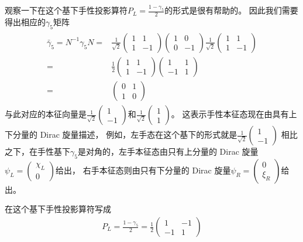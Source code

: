 观察一下在这个基下手性投影算符$P_L=\frac{1-\gamma_5}{2}$的形式是很有帮助的。
因此我们需要得出相应的$\gamma_5$矩阵
\begin{align}
\begin{split}
  \bar{\gamma}_5=N^{-1}\gamma_5N=&\frac{1}{\sqrt{2}}\begin{pmatrix}1&1\\1&-1\end{pmatrix}\begin{pmatrix}1&0\\0&-1\end{pmatrix}
  \frac{1}{\sqrt{2}}\begin{pmatrix}1&1\\1&-1\end{pmatrix}\\
  =&\frac{1}{2}\begin{pmatrix}1&1\\1&-1\end{pmatrix}\begin{pmatrix}1&1\\-1&1\end{pmatrix}\\
  =&\begin{pmatrix}0&1\\1&0\end{pmatrix}
\end{split}
\end{align}
与此对应的本征向量是$\frac{1}{\sqrt{2}}\begin{pmatrix}1\\-1\end{pmatrix}$和$\frac{1}{\sqrt{2}}\begin{pmatrix}1\\1\end{pmatrix}$。
这表示手性本征态现在由具有上下分量的 Dirac 旋量描述，
例如，左手态在这个基下的形式就是$\frac{1}{\sqrt{2}}\begin{pmatrix}1\\-1\end{pmatrix}$
相比之下，在手性基下$\gamma_5$是对角的，左手本征态由只有上分量的 Dirac 旋量$\psi_L=\begin{pmatrix}\chi_L\\0\end{pmatrix}$给出，
右手本征态则由只有下分量的 Dirac 旋量$\psi_R=\begin{pmatrix}0\\\xi_R\end{pmatrix}$给出。

在这个基下手性投影算符写成
\begin{align}
  P_L=\frac{1-\gamma_5}{2}=\frac{1}{2}\begin{pmatrix}1&-1\\-1&1\end{pmatrix}
\end{align}

